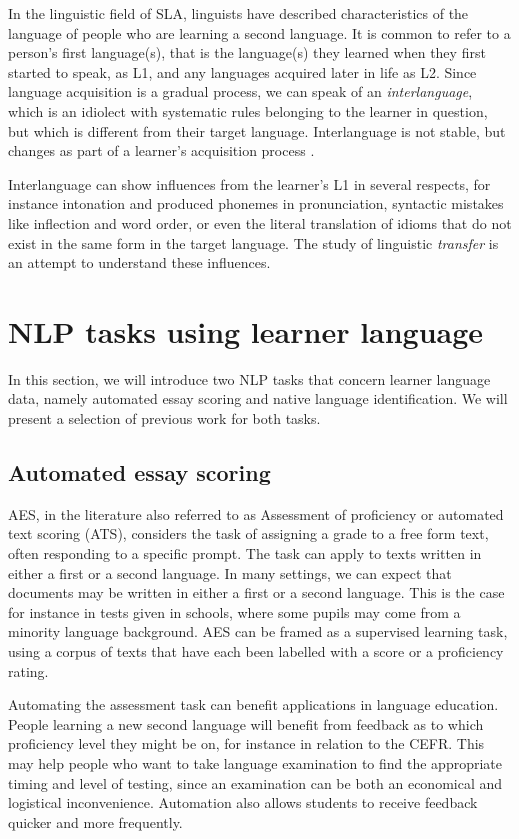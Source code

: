 In the linguistic field of \ac{SLA}, linguists have described characteristics
of the language of people who are learning a second language. It is common to
refer to a person's first language(s), that is the language(s) they learned
when they first started to speak, as L1, and any languages acquired later in
life as L2. Since language acquisition is a gradual process, we can speak of
an \emph{interlanguage}, which is an idiolect with systematic rules belonging
to the learner in question, but which is different from their target
language. Interlanguage is not stable, but changes as part of a learner's
acquisition process \autocite[358]{myers-scotton}.

Interlanguage can show influences from the learner's L1 in several respects,
for instance intonation and produced phonemes in pronunciation, syntactic
mistakes like inflection and word order, or even the literal translation of
idioms that do not exist in the same form in the target language. The study
of linguistic \emph{transfer} is an attempt to understand these influences.


\section{NLP tasks using learner language}

In this section, we will introduce two \ac{NLP} tasks that concern learner
language data, namely automated essay scoring and native language
identification. We will present a selection of previous work for both tasks.


\subsection{Automated essay scoring}

\acf{AES}, in the literature also referred to as Assessment of proficiency or
automated text scoring (ATS), considers the task of assigning a grade to a
free form text, often responding to a specific prompt. The task can apply to
texts written in either a first or a second language. In many settings, we
can expect that documents may be written in either a first or a second
language. This is the case for instance in tests given in schools, where some
pupils may come from a minority language background. \ac{AES} can be framed
as a supervised learning task, using a corpus of texts that have each been
labelled with a score or a proficiency rating.

Automating the assessment task can benefit applications in language
education. People learning a new second language will benefit from feedback
as to which proficiency level they might be on, for instance in relation to
the \ac{CEFR}. This may help people who want to take language
examination to find the appropriate timing and level of testing, since an
examination can be both an economical and logistical inconvenience.
Automation also allows students to receive feedback quicker and more
frequently.

